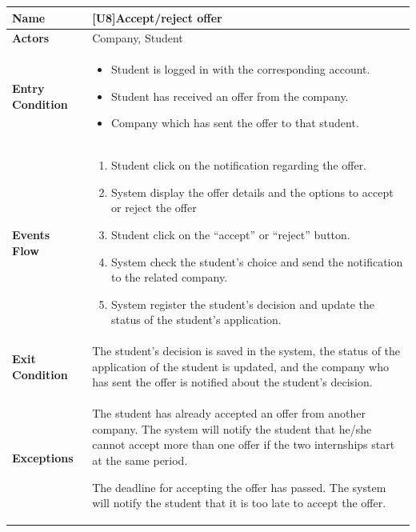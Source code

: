 \begin{center}
    \begin{tabular}{|p{9em}|p{27em}|}
        \hline
        \rowcolor{bluepoli!40} %
        \textbf{Name} & \textbf{[U8]Accept/reject offer} \\
        \hline
        \textbf{Actors} & Company, Student\\
        \hline
        \textbf{Entry Condition} & 
        \begin{itemize}
            \item Student is logged in with the corresponding account.
            \item Student has received an offer from the company.
            \item Company which has sent the offer to that student.
        \end{itemize} \\
        \hline
        \textbf{Events Flow} & 
        \begin{enumerate}
            \item Student click on the notification regarding the offer.
            \item System display the offer details and the options to accept or reject the offer
            \item Student click on the ``accept'' or ``reject'' button.
            \item System check the student's choice and send the notification to the related company.
            \item System register the student's decision and update the status of the student's application.
        \end{enumerate} \\
        \hline
        \textbf{Exit Condition} & 
         The student's decision is saved in the system, the status of the application of the student is updated, and the company
         who has sent the offer is notified about the student's decision.\\
        \hline
        \textbf{Exceptions} &
        The student has already accepted an offer from another company. The system will notify the student that he/she cannot accept
        more than one offer if the two internships start at the same period.

        The deadline for accepting the offer has passed. The system will notify the student that it is too late to accept the offer.\\
        \hline
    \end{tabular}
\end{center}

